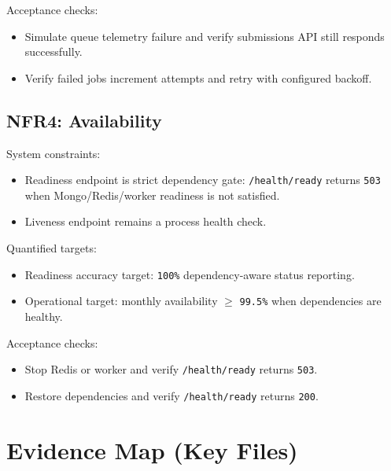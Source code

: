 \documentclass[12pt,journal,onecolumn]{IEEEtran}
\begin{document}
Acceptance checks:
\begin{itemize}
    \item Simulate queue telemetry failure and verify submissions API still responds successfully.
    \item Verify failed jobs increment attempts and retry with configured backoff.
\end{itemize}

\subsection{NFR4: Availability}

System constraints:
\begin{itemize}
    \item Readiness endpoint is strict dependency gate: \texttt{/health/ready} returns \texttt{503} when Mongo/Redis/worker readiness is not satisfied.
    \item Liveness endpoint remains a process health check.
\end{itemize}

Quantified targets:
\begin{itemize}
    \item Readiness accuracy target: \texttt{100\%} dependency-aware status reporting.
    \item Operational target: monthly availability $\geq$ \texttt{99.5\%} when dependencies are healthy.
\end{itemize}

Acceptance checks:
\begin{itemize}
    \item Stop Redis or worker and verify \texttt{/health/ready} returns \texttt{503}.
    \item Restore dependencies and verify \texttt{/health/ready} returns \texttt{200}.
\end{itemize}

\section{Evidence Map (Key Files)}
\end{document}
